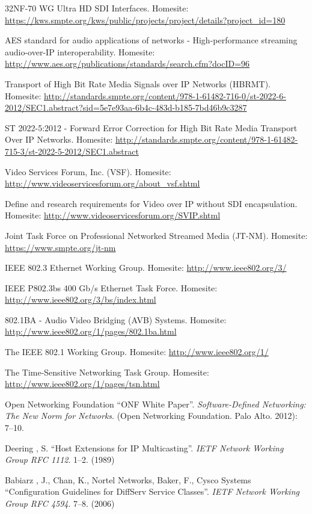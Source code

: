 \documentclass[english,final]{setup/eetac_tfc_pfc}
\begin{document}
\begin{thebibliography}{2}
32NF-70 WG Ultra HD SDI Interfaces. Homesite: \url{https://kws.smpte.org/kws/public/projects/project/details?project_id=180}

AES standard for audio applications of networks - High-performance streaming audio-over-IP interoperability. Homesite: \url{http://www.aes.org/publications/standards/search.cfm?docID=96}

Transport of High Bit Rate Media Signals over IP Networks (HBRMT). Homesite: \url{http://standards.smpte.org/content/978-1-61482-716-0/st-2022-6-2012/SEC1.abstract?sid=5e7e93aa-6b4c-483d-b185-7bd46b9c3287}

ST 2022-5:2012 - Forward Error Correction for High Bit Rate Media Transport Over IP Networks. Homesite: \url{http://standards.smpte.org/content/978-1-61482-715-3/st-2022-5-2012/SEC1.abstract}

Video Services Forum, Inc. (VSF). Homesite: \url{http://www.videoservicesforum.org/about_vsf.shtml}

Define and research requirements for Video over IP without SDI encapsulation. Homesite: \url{http://www.videoservicesforum.org/SVIP.shtml}

Joint Task Force on Professional Networked Streamed Media (JT-NM). Homesite: \url{https://www.smpte.org/jt-nm}

IEEE 802.3 Ethernet Working Group. Homesite: \url{http://www.ieee802.org/3/}

IEEE P802.3bs 400 Gb/s Ethernet Task Force. Homesite: \url{http://www.ieee802.org/3/bs/index.html}

802.1BA - Audio Video Bridging (AVB) Systems. Homesite: \url{http://www.ieee802.org/1/pages/802.1ba.html}

The IEEE 802.1 Working Group. Homesite: \url{http://www.ieee802.org/1/}

The Time-Sensitive Networking Task Group. Homesite: \url{http://www.ieee802.org/1/pages/tsn.html}

Open Networking Foundation 
``ONF White Paper''. {\it Software-Defined Networking: The New Norm for Networks}.
(Open Networking Foundation. Palo Alto. 2012): 7--10.

Deering , S.
``Host Extensions for IP Multicasting''. {\it IETF Network Working Group RFC 1112}.
1--2. (1989) 

Babiarz , J., Chan, K., Nortel Networks, Baker, F., Cysco Systems
``Configuration Guidelines for DiffServ Service Classes''. {\it IETF Network Working Group RFC 4594}.
7--8. (2006) 


\end{thebibliography}
\end{document}

